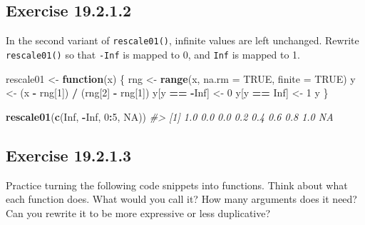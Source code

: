 \documentclass[]{book}
\newenvironment{Shaded}{\begin{snugshade}}{\end{snugshade}}
\newcommand{\CommentTok}[1]{\textcolor[rgb]{0.56,0.35,0.01}{\textit{#1}}}
\newcommand{\ControlFlowTok}[1]{\textcolor[rgb]{0.13,0.29,0.53}{\textbf{#1}}}
\newcommand{\DataTypeTok}[1]{\textcolor[rgb]{0.13,0.29,0.53}{#1}}
\newcommand{\DecValTok}[1]{\textcolor[rgb]{0.00,0.00,0.81}{#1}}
\newcommand{\KeywordTok}[1]{\textcolor[rgb]{0.13,0.29,0.53}{\textbf{#1}}}
\newcommand{\NormalTok}[1]{#1}
\newcommand{\OperatorTok}[1]{\textcolor[rgb]{0.81,0.36,0.00}{\textbf{#1}}}
\newcommand{\OtherTok}[1]{\textcolor[rgb]{0.56,0.35,0.01}{#1}}
\newcommand{\StringTok}[1]{\textcolor[rgb]{0.31,0.60,0.02}{#1}}
\theoremstyle{plain}
\theoremstyle{remark}
\begin{document}
\hypertarget{exercise-19.2.1.2}{%
\subsection*{\texorpdfstring{Exercise
{19.2.1.2}}{Exercise 19.2.1.2}}\label{exercise-19.2.1.2}}

In the second variant of \texttt{rescale01()}, infinite values are left
unchanged. Rewrite \texttt{rescale01()} so that \texttt{-Inf} is mapped
to 0, and \texttt{Inf} is mapped to 1.

\begin{Shaded}
\begin{Highlighting}[]
\NormalTok{rescale01 <-}\StringTok{ }\ControlFlowTok{function}\NormalTok{(x) \{}
\NormalTok{  rng <-}\StringTok{ }\KeywordTok{range}\NormalTok{(x, }\DataTypeTok{na.rm =} \OtherTok{TRUE}\NormalTok{, }\DataTypeTok{finite =} \OtherTok{TRUE}\NormalTok{)}
\NormalTok{  y <-}\StringTok{ }\NormalTok{(x }\OperatorTok{-}\StringTok{ }\NormalTok{rng[}\DecValTok{1}\NormalTok{]) }\OperatorTok{/}\StringTok{ }\NormalTok{(rng[}\DecValTok{2}\NormalTok{] }\OperatorTok{-}\StringTok{ }\NormalTok{rng[}\DecValTok{1}\NormalTok{])}
\NormalTok{  y[y }\OperatorTok{==}\StringTok{ }\OperatorTok{-}\OtherTok{Inf}\NormalTok{] <-}\StringTok{ }\DecValTok{0}
\NormalTok{  y[y }\OperatorTok{==}\StringTok{ }\OtherTok{Inf}\NormalTok{] <-}\StringTok{ }\DecValTok{1}
\NormalTok{  y}
\NormalTok{\}}

\KeywordTok{rescale01}\NormalTok{(}\KeywordTok{c}\NormalTok{(}\OtherTok{Inf}\NormalTok{, }\OperatorTok{-}\OtherTok{Inf}\NormalTok{, }\DecValTok{0}\OperatorTok{:}\DecValTok{5}\NormalTok{, }\OtherTok{NA}\NormalTok{))}
\CommentTok{#> [1] 1.0 0.0 0.0 0.2 0.4 0.6 0.8 1.0  NA}
\end{Highlighting}
\end{Shaded}

\hypertarget{exercise-19.2.1.3}{%
\subsection*{\texorpdfstring{Exercise
{19.2.1.3}}{Exercise 19.2.1.3}}\label{exercise-19.2.1.3}}

Practice turning the following code snippets into functions. Think about
what each function does. What would you call it? How many arguments does
it need? Can you rewrite it to be more expressive or less duplicative?
\end{document}
